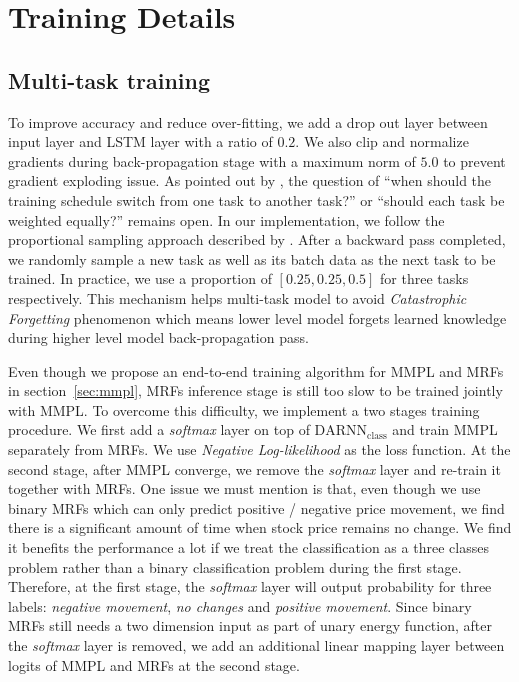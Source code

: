 \section{Training Details}
\label{sec:train_detail}

\subsection{Multi-task training}
\label{sec:multi_train}

To improve accuracy and reduce over-fitting, we add a drop out
layer between input layer and LSTM layer with a ratio of $0.2$.
We also clip and normalize gradients during back-propagation
stage with a maximum norm of $5.0$ to prevent gradient exploding
issue. As pointed out by , the
question of ``when should the training schedule switch from one
task to another task?'' or ``should each task be weighted
equally?'' remains open. In our implementation, we follow the
proportional sampling approach described by
. After a backward pass completed, we
randomly sample a new task as well as its batch data as the next
task to be trained. In practice, we use a proportion of
$[0.25,0.25,0.5]$ for three tasks respectively. This mechanism
helps multi-task model to avoid \emph{Catastrophic Forgetting}
phenomenon which means lower level model forgets learned
knowledge during higher level model back-propagation pass.

Even though we propose an end-to-end training algorithm for MMPL
and MRFs in section~\ref{sec:mmpl}, MRFs inference stage is still
too slow to be trained jointly with MMPL. To overcome this
difficulty, we implement a two stages training procedure. We
first add a \emph{softmax} layer on top of
$\text{DARNN}_{\text{class}}$ and train MMPL separately from
MRFs. We use \emph{Negative Log-likelihood} as the loss function.
At the second stage, after MMPL converge, we remove the
\emph{softmax} layer and re-train it together with MRFs. One
issue we must mention is that, even though we use binary MRFs
which can only predict positive / negative price movement, we
find there is a significant amount of time when stock price
remains no change. We find it benefits the performance a lot if
we treat the classification as a three classes problem rather
than a binary classification problem during the first stage.
Therefore, at the first stage, the \emph{softmax} layer will
output probability for three labels: \emph{negative movement},
\emph{no changes} and \emph{positive movement}. Since binary MRFs
still needs a two dimension input as part of unary energy
function, after the \emph{softmax} layer is removed, we add an
additional linear mapping layer between logits of MMPL and MRFs
at the second stage.

